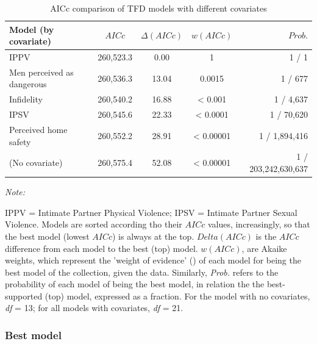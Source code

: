 \documentclass[
  bookmarksnumbered]{article}
\begin{document}
\begin{table}[H]
\centering
\caption{\label{tab:comp-m2}AICc comparison of TFD models with different covariates}
\centering
\begin{threeparttable}
\begin{tabular}[t]{lcccr}
\toprule
Model (by covariate) & $AICc$ & $\Delta(AICc)$ & $w(AICc)$ & $Prob.$\\
\midrule
IPPV & 260,523.3 & 0.00 & 1 & 1 / 1\\
Men perceived as dangerous & 260,536.3 & 13.04 & 0.0015 & 1 / 677\\
Infidelity & 260,540.2 & 16.88 & < 0.001 & 1 / 4,637\\
IPSV & 260,545.6 & 22.33 & < 0.0001 & 1 / 70,620\\
Perceived home safety & 260,552.2 & 28.91 & < 0.00001 & 1 / 1,894,416\\
(No covariate) & 260,575.4 & 52.08 & < 0.00001 & 1 / 203,242,630,637\\
\bottomrule
\end{tabular}
\begin{tablenotes}[para]
\item \textit{Note: } 
\item IPPV = Intimate Partner Physical Violence; 
             IPSV = Intimate Partner Sexual Violence.
             Models are sorted according tho their $AICc$ values, increasingly, 
             so that the best model (lowest $AICc$) is always at the top. 
             $Delta(AICc)$ is the $AICc$ difference from each model to the best (top) model. 
             $w(AICc)$, are Akaike weights, which represent the 'weight of evidence'
             (\cite{portetPrimerModelSelection2020}) of each model for being the best model 
             of the collection, given the data. 
             Similarly, \textit{Prob.} refers to the probability of each model of being the 
             best model, in relation the the best-supported (top) model, expressed as a 
             fraction. For the model with no covariates, \textit{df} = 13; for all models 
             with covariates, \textit{df} = 21.
\end{tablenotes}
\end{threeparttable}
\end{table}

\subsubsection{Best model}\label{best-model-1}
\end{document}
